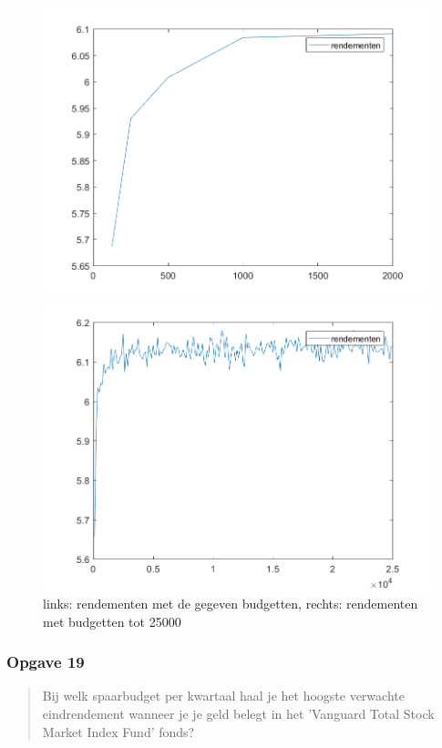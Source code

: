 \documentclass[11pt, a4paper, titlepage, openright]{article}
\begin{document}
		\begin{figure}[H]
		\begin{minipage}[b]{0.49\textwidth}
		\includegraphics[width=1.0\linewidth]{../ex18}
		\end{minipage}
		\hfill
		\begin{minipage}[b]{0.49\textwidth}
		\includegraphics[width=1\linewidth]{../ex18-veel-budgetten}
		\end{minipage}
		\caption{links: rendementen met de gegeven budgetten, rechts: rendementen met budgetten tot 25000}
		\label{fig:ex18}
		\end{figure}

	\subsubsection{Opgave 19}
		\begin{quote}
			Bij welk spaarbudget per kwartaal haal je het hoogste verwachte eindrendement wanneer je je geld belegt in het
			'Vanguard Total Stock Market Index Fund' fonds?
		\end{quote}
\end{document}
